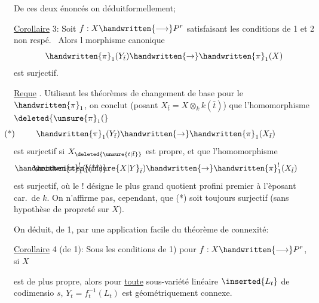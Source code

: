 De ces deux énoncés on déduit\handwritten{/}formellement;

\uline{Corollaire} 3: Soit $f:X\handwritten{\longrightarrow}P^r$ satisfaisant les conditions de 1\handwritten{,} et 2 non respé.\  Alors l morphisme canonique
\[
\handwritten{\pi}_1(Y_{\bar{t}})\handwritten{\rightarrow}\handwritten{\pi}_1(X)
\]
est surjectif.

\uline{Reque} . Utilisant les théorèmes de changement de base pour le $\handwritten{\pi}_1$, on conclut  (posant $X_{\bar{t}}=X\otimes_k k(\bar{t})$) que l'homomorphisme $\deleted{\unsure{\pi}_1(}$
\[
\handwritten{\pi}_1(Y_{\bar{t}})\handwritten{\rightarrow}\handwritten{\pi}_1(X_{\bar{t}})\tag*{\makebox[0pt][r]{\makebox[\linewidth][l]{(*)}}}
\]
est surjectif si $X_{\deleted{\unsure{t|\bar{t}}}}$ est propre, et que l'homomorphisme
\[
\handwritten{\pi}_1^{!}(\unsure{X|Y}_{\bar{t}})\handwritten{\rightarrow}\handwritten{\pi}_1^{!}(X_{\bar{t}})\tag*{\makebox[0pt][r]{\makebox[\linewidth][l]{\handwritten{(**)}}}}
\]
est surjectif, où le ! désigne le plus grand quotient profini premier à l'èposant car.\ de $k$. On n'affirme pas, cependant, que (*) soit toujours surjectif (sans hypothèse de propreté sur $X$).

On déduit, de 1, par une application facile du théorème de connexité:

\uline{Corollaire} 4 (de 1): Sous les conditions de 1) pour $f:X\handwritten{\longrightarrow}P^r$, si $X$

est de plus propre, alors pour \uline{toute} sous-variété linéaire $\inserted{L_t}$ de codimensio $s$, $Y_t=f_t^{-1}(L_t)$ est géométriquement connexe.


